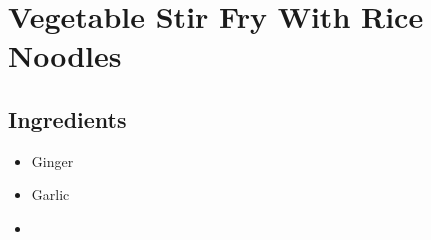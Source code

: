 \thispagestyle{fancy}
\section{Vegetable Stir Fry With Rice Noodles}
\AddToShipoutPicture*{\StirFryRiceNoodles}

\subsection*{Ingredients}
\begin{multicols}{3}
	\begin{itemize}
		\item Ginger
		\item Garlic
		\item 
	\end{itemize}
\end{multicols}